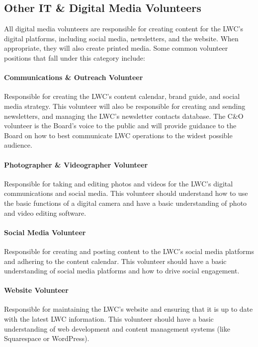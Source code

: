 \documentclass[letterpaper,11pt,leqno]{article}
\begin{document}
\subsection{Other IT \& Digital Media Volunteers}\label{s:dmVolunteer}

All digital media volunteers are responsible for creating content for the LWC's digital platforms, including social media, newsletters, and the website. When appropriate, they will
also create printed media. Some common volunteer positions that fall under this category include:

\paragraph{Communications \& Outreach Volunteer} Responsible for creating the LWC's content calendar, brand guide, and social media strategy. This volunteer will also be responsible for creating and sending newsletters, and managing the LWC's newsletter contacts database.
The C\&O volunteer is the Board's voice to the public and will provide guidance to the Board on how to best communicate LWC operations to the widest possible audience.

\paragraph{Photographer \& Videographer Volunteer} Responsible for taking and editing photos and videos for the LWC's digital communications and social media. This volunteer should understand how to use
the basic functions of a digital camera and have a basic understanding of photo and video editing software.

\paragraph{Social Media Volunteer} Responsible for creating and posting content to the LWC's social media platforms and adhering to the content calendar. This volunteer should have a basic understanding of social media platforms and how to drive social engagement.

\paragraph{Website Volunteer} Responsible for maintaining the LWC's website and ensuring that it is up to date with the latest LWC information. This volunteer should have a basic understanding of web development and content management systems (like Squarespace or WordPress).
%
\end{document}
